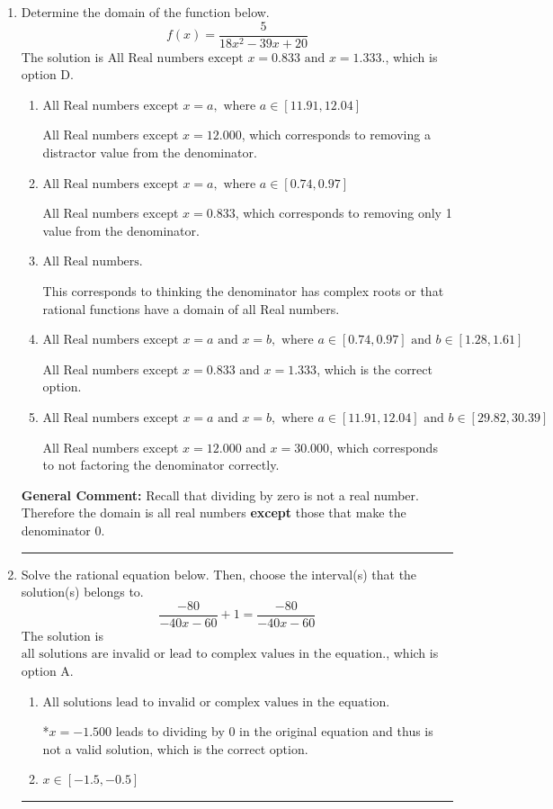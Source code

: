 \documentclass{extbook}[14pt]
\newcommand{\litem}[1]{\item #1

\rule{\textwidth}{0.4pt}}
\begin{document}
\begin{enumerate}\litem{
Determine the domain of the function below.
\[ f(x) = \frac{5}{18x^{2} -39 x + 20} \]The solution is \( \text{All Real numbers except } x = 0.833 \text{ and } x = 1.333. \), which is option D.\begin{enumerate}[label=\Alph*.]
\item \( \text{All Real numbers except } x = a, \text{ where } a \in [11.91, 12.04] \)

All Real numbers except $x = 12.000$, which corresponds to removing a distractor value from the denominator.
\item \( \text{All Real numbers except } x = a, \text{ where } a \in [0.74, 0.97] \)

All Real numbers except $x = 0.833$, which corresponds to removing only 1 value from the denominator.
\item \( \text{All Real numbers.} \)

This corresponds to thinking the denominator has complex roots or that rational functions have a domain of all Real numbers.
\item \( \text{All Real numbers except } x = a \text{ and } x = b, \text{ where } a \in [0.74, 0.97] \text{ and } b \in [1.28, 1.61] \)

All Real numbers except $x = 0.833$ and $x = 1.333$, which is the correct option.
\item \( \text{All Real numbers except } x = a \text{ and } x = b, \text{ where } a \in [11.91, 12.04] \text{ and } b \in [29.82, 30.39] \)

All Real numbers except $x = 12.000$ and $x = 30.000$, which corresponds to not factoring the denominator correctly.
\end{enumerate}

\textbf{General Comment:} Recall that dividing by zero is not a real number. Therefore the domain is all real numbers \textbf{except} those that make the denominator 0.
}
\litem{
Solve the rational equation below. Then, choose the interval(s) that the solution(s) belongs to.
\[ \frac{-80}{-40x -60} + 1 = \frac{-80}{-40x -60} \]The solution is \( \text{all solutions are invalid or lead to complex values in the equation.} \), which is option A.\begin{enumerate}[label=\Alph*.]
\item \( \text{All solutions lead to invalid or complex values in the equation.} \)

*$x = -1.500$ leads to dividing by 0 in the original equation and thus is not a valid solution, which is the correct option.
\item \( x \in [-1.5,-0.5] \)


\end{enumerate}}
\end{enumerate}
\end{document}
